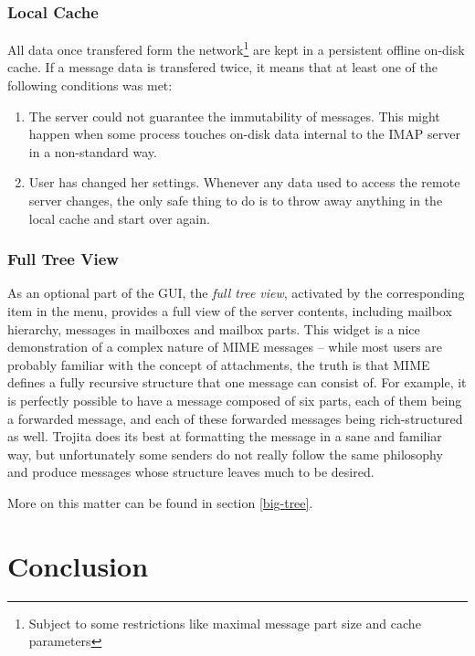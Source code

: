 \documentclass[12pt,notitlepage]{report}
\newcommand{\trojita}{Trojita\xspace}
\begin{document}
\subsection{Local Cache}

All data once transfered form the network\footnote{Subject to some restrictions
like maximal message part size and cache parameters} are kept in a persistent
offline on-disk cache.  If a message data is transfered twice, it means that at
least one of the following conditions was met:

\begin{enumerate}
    \item{The server could not guarantee the immutability of messages.  This might
        happen when some process touches on-disk data internal to the IMAP
        server in a non-standard way.}
    \item{User has changed her settings.  Whenever any data used to access the
        remote server changes, the only safe thing to do is to throw away
        anything in the local cache and start over again.}
\end{enumerate}

\subsection{Full Tree View}

As an optional part of the GUI, the {\em full tree view}, activated by the
corresponding item in the menu, provides a full view of the server contents,
including mailbox hierarchy, messages in mailboxes and mailbox parts.  This
widget is a nice demonstration of a complex nature of MIME messages -- while
most users are probably familiar with the concept of attachments, the truth is
that MIME defines a fully recursive structure that one message can consist of.
For example, it is perfectly possible to have a message composed of six parts,
each of them being a forwarded message, and each of these forwarded messages
being rich-structured as well.  \trojita does its best at formatting the message
in a sane and familiar way, but unfortunately some senders do not really follow
the same philosophy and produce messages whose structure leaves much to be
desired.

More on this matter can be found in section \ref{big-tree}.

\chapter{Conclusion}
\end{document}
